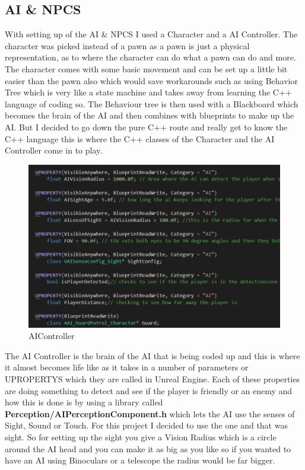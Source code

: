 \subsection{AI \& NPCS}
With setting up of the AI \& NPCS I used a Character and a AI Controller. The character was picked instead of a pawn as a pawn is just a physical representation, as to where the character can do what a pawn can do and more. The character comes with some basic movement and can be set up a little bit easier than the pawn also which would save workarounds such as using Behavior Tree which is very like a state machine and takes away from learning the C++ language of coding so. The Behaviour tree is then used with a Blackboard which becomes the brain of the AI and then combines with blueprints to make up the AI. But I decided to go down the pure C++ route and really get to know the C++ language this is where the C++ classes of the Character and the AI Controller come in to play.
\begin{figure}[H]
    \centering
    \includegraphics[scale=.5]{img/AIController.PNG}
    \caption{AIController}
    \label{AiController}
\end{figure}
The AI Controller is the brain of the AI that is being coded up and this is where it almost becomes life like as it takes in a number of parameters or UPROPERTYS which they are called in Unreal Engine. Each of these properties are doing something to detect and see if the player is friendly or an enemy and how this is done is by using a library called \textbf{Perception/AIPerceptionComponent.h} which lets the AI use the senses of Sight, Sound or Touch. For this project I decided to use the one and that was sight. So for setting up the sight you give a Vision Radius which is a circle around the AI head and you can make it as big as you like so if you wanted to have an AI using Binoculars or a telescope the radius would be far bigger. 
